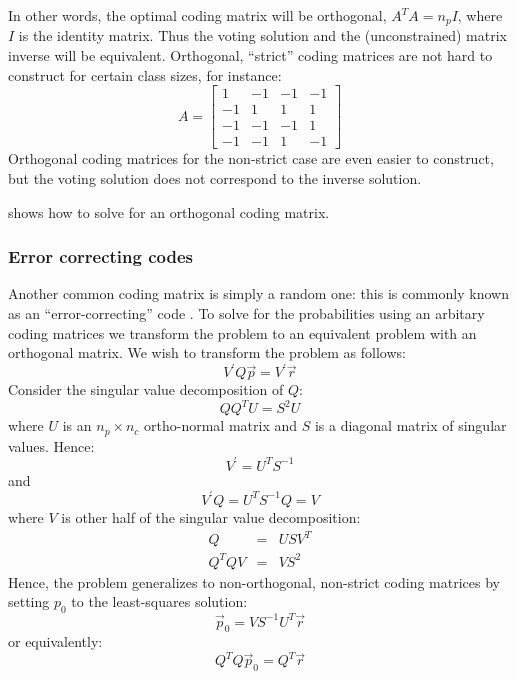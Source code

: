 \documentclass{article}
\begin{document}
In other words, 
the optimal coding matrix will be orthogonal, $A^T A = n_p I$, where $I$ is
the identity matrix. Thus the voting solution and the (unconstrained) matrix 
inverse will be equivalent. Orthogonal, ``strict'' coding matrices 
are not hard to construct for certain class sizes, for instance:
\begin{equation}
A = 
\begin{bmatrix}
1 & -1 & -1 & -1 \\
-1 & 1 & 1 & 1 \\
-1 & -1 & -1 & 1 \\
-1 & -1 & 1 & -1
\end{bmatrix}
\end{equation}
Orthogonal coding matrices for the non-strict case are even easier to
construct, but the voting solution does not correspond to the inverse solution.

\citet{Mills2017} shows how to solve for an orthogonal coding matrix.

\subsubsection{Error correcting codes}

Another common coding matrix is simply a random one: this is commonly
known as an ``error-correcting'' code \citep{Dietterich_Bakiri1995}.
To solve for the probabilities using an arbitary coding matrices
we transform the problem to an equivalent problem with an orthogonal
matrix.
We wish to transform the problem as follows:
\begin{equation}
	V^\prime Q \vec p = V^\prime \vec r
\end{equation}
Consider the singular value decomposition of $Q$:
\begin{equation}
	Q Q^T U = S^2 U
\end{equation}
where $U$ is an $n_p \times n_c$ ortho-normal matrix and $S$ is a diagonal
matrix of singular values.
Hence:
\begin{equation}
	V^\prime = U^T S^{-1}
\end{equation}
and
\begin{equation}
	V^\prime Q = U^T S^{-1} Q = V
\end{equation}
where $V$ is other half of the singular value decomposition:
\begin{eqnarray}
	Q & = & U S V^T \\
	Q^T Q V & = & V S^2
\end{eqnarray}
Hence, the problem generalizes to non-orthogonal, non-strict coding matrices
by setting $p_0$ to the least-squares solution:
\begin{equation}
	\vec p_0 = V S^{-1} U^T \vec r
\end{equation}
or equivalently:
\begin{equation}
	Q^T Q \vec p_0 = Q^T \vec r
\end{equation}
\end{document}
